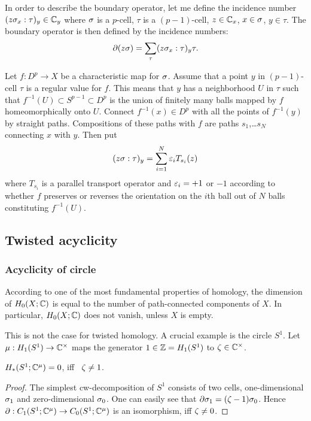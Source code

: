 \documentclass{article}
\numberwithin{equation}{section}
\begin{document}
In order to describe the boundary operator, let me define the {\sfit
incidence number\/} $(z\sigma_x:\tau)_y\in\mathbb C_y$ where $\sigma$ is a $p$-cell, 
$\tau$ is a $(p-1)$-cell, $z\in\mathbb C_x$, $x\in\sigma$, $y\in\tau$.
The boundary operator is then defined by the incidence numbers:
$$\partial(z\sigma)=\sum_\tau(z\sigma_x:\tau)_y\tau.$$

Let  $f:D^p\to X$ be a characteristic map for $\sigma$. Assume that a point
$y$ in $(p-1)$-cell $\tau$ is a regular value for $f$. This means that  
$y$ has a neighborhood $U$ in $\tau$ such that $f^{-1}(U)\subset
S^{p-1}\subset D^p$ is the union of finitely many balls mapped by $f$
homeomorphically onto $U$. Connect
$f^{-1}(x)\in D^p$ with all the points of $f^{-1}(y)$ by straight paths.
Compositions of these paths with $f$ are paths $s_1$,\dots $s_N$ 
connecting $x$ with $y$. Then put 
$$
(z\sigma:\tau)_y=\sum_{i=1}^N\varepsilon_iT_{s_i}(z)
$$
where $T_{s_i}$ is a parallel transport operator and 
$\varepsilon_i=+1$ or $-1$ according to whether $f$ preserves or reverses
the orientation on the $i$th ball out of $N$ balls constituting
$f^{-1}(U)$.



\subsection{Twisted acyclicity}\label{sT.2} 

\subsubsection{Acyclicity of circle}\label{sT.2.1} 
According to one
of the most fundamental properties of homology, the dimension of 
 $H_0(X;\mathbb C)$ 
is equal to the number of path-connected components of $X$. In
particular, $H_0(X;\mathbb C)$ does not vanish, unless $X$ is empty.

This is not the case for twisted homology. A crucial example is the 
circle $S^1$.  Let $\mu:H_1(S^1)\to\mathbb C^\times$ maps the generator
$1\in\mathbb Z=H_1(S^1)$ to $\zeta\in\mathbb C^\times$. 

\begin{ATh}\label{1.A}
$H_*(S^1;\mathbb C^\mu)=0$, iff \ $\zeta\ne 1$.
\end{ATh}

\begin{proof}The simplest cw-decomposition of $S^1$
consists of two cells, one-dimensional $\sigma_1$ and zero-dimensional
$\sigma_0$. One can easily see that $\partial\sigma_1=(\zeta-1)\sigma_0$. Hence 
$\partial:C_1(S^1;\mathbb C^\mu)\to
C_0(S^1;\mathbb C^\mu)$ is an isomorphism, iff $\zeta\ne0$. 
\end{proof}
\end{document}
